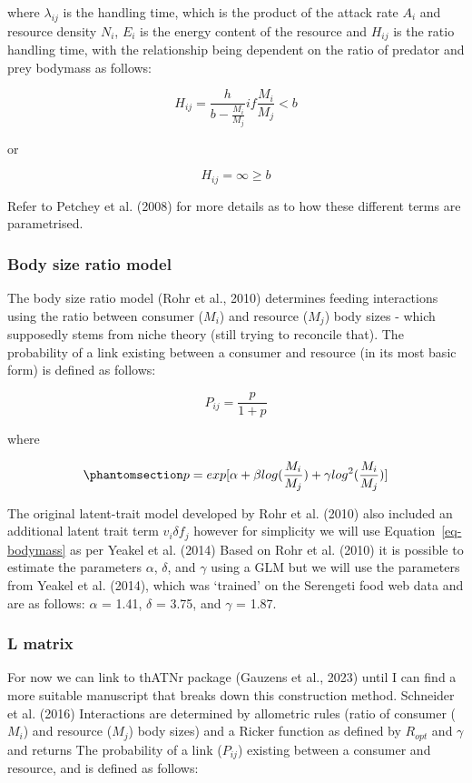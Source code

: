 \documentclass[
]{article}
\begin{document}
where \(\lambda_{ij}\) is the handling time, which is the product of the
attack rate \(A_{i}\) and resource density \(N_{i}\), \(E_{i}\) is the
energy content of the resource and \(H_{ij}\) is the ratio handling
time, with the relationship being dependent on the ratio of predator and
prey bodymass as follows:

\[
H_{ij} = \frac{h}{b - \frac{M_{i}}{M_{j}}} if \frac{M_{i}}{M_{j}} < b
\]

or

\[
H_{ij} = \infty \geq b
\]

Refer to Petchey et al. (2008) for more details as to how these
different terms are parametrised.

\subsubsection{Body size ratio model}\label{body-size-ratio-model}

The body size ratio model (Rohr et al., 2010) determines feeding
interactions using the ratio between consumer (\(M_{i}\)) and resource
(\(M_{j}\)) body sizes - which supposedly stems from niche theory (still
trying to reconcile that). The probability of a link existing between a
consumer and resource (in its most basic form) is defined as follows:

\[
P_{ij} = \frac{p}{1+p}
\]

where

\begin{equation}\phantomsection\label{eq-bodymass}{
p = exp[\alpha + \beta log(\frac{M_{i}}{M_{j}}) + \gamma log^{2}(\frac{M_{i}}{M_{j}})]
}\end{equation}

The original latent-trait model developed by Rohr et al. (2010) also
included an additional latent trait term \(v_{i} \delta f_{j}\) however
for simplicity we will use Equation~\ref{eq-bodymass} as per Yeakel et
al. (2014) Based on Rohr et al. (2010) it is possible to estimate the
parameters \(\alpha\), \(\delta\), and \(\gamma\) using a GLM but we
will use the parameters from Yeakel et al. (2014), which was `trained'
on the Serengeti food web data and are as follows: \(\alpha\) = 1.41,
\(\delta\) = 3.75, and \(\gamma\) = 1.87.

\subsubsection{L matrix}\label{l-matrix}

For now we can link to thATNr package (Gauzens et al., 2023) until I can
find a more suitable manuscript that breaks down this construction
method. Schneider et al. (2016) Interactions are determined by
allometric rules (ratio of consumer (\(M_{i}\)) and resource (\(M_{j}\))
body sizes) and a Ricker function as defined by \(R_{opt}\) and
\(\gamma\) and returns The probability of a link (\(P_{ij}\)) existing
between a consumer and resource, and is defined as follows:
\end{document}
